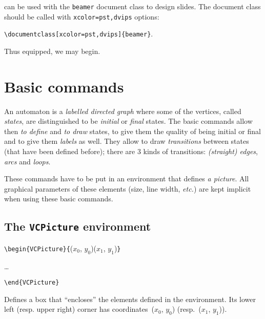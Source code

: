 \documentclass[11pt,twoside]{article}
\newlength{\ColoText}%
\newlength{\ColoFigu}%
\newlength{\parindenttemp} %
\newcommand{\noi}{\noindent}
\newcommand{\etc}{{\itshape etc.}\xspace } %
\newlength{\jsIndent}%
\begin{document}
\VCSG can be used with the \texttt{beamer} document class to design slides.
The document class
%
should be called with {\tt xcolor=pst,dvips} options:

\verb+\documentclass[xcolor=pst,dvips]{beamer}+.

\noindent
Thus equipped, we may begin.
\section{Basic commands}\label{sec.b}

An automaton is a \emph{labelled directed graph} where some of the vertices, 
called \emph{states}, are distinguished to be \emph{initial} or 
\emph{final} states.
The basic commands allow then \emph{to define} and \emph{to draw} 
states, to give them the quality of being initial or final and to give 
them \emph{labels} as well.
They allow to draw \emph{transitions} 
between states (that have been defined before);
there are 3 kinds of transitions: \emph{(straight) edges}, \emph{arcs} and 
\emph{loops}.

These commands have to be put in an environment that defines \emph{a 
picture}.
All graphical parameters of these elements (size, line width, \etc ) 
are kept implicit when using these basic commands.

\subsection{The \texttt{VCPicture} environment}\label{subsec.pic}

\noi 
\hspace*{-\jsIndent}
\begin{minipage}[t]{\ColoText}
        \par\vspace*{0mm}%
        \footnotesize
\verb+\begin{VCPicture}{+($x_{0}$, $y_{0}$)($x_{1}$, $y_{1}$)\verb+}+

\ldots

\verb+\end{VCPicture}+
\normalsize
\end{minipage}%
\hspace*{1.2em}%
\begin{minipage}[t]{\ColoFigu}%
\par\vspace*{0mm}%
Defines a box that ``encloses'' the elements defined in the 
environment.
Its lower left (resp. upper right) corner has 
coordinates~($x_{0}$, $y_{0}$) (resp.~($x_{1}$, $y_{1}$)).
\end{minipage}%
\end{document}
